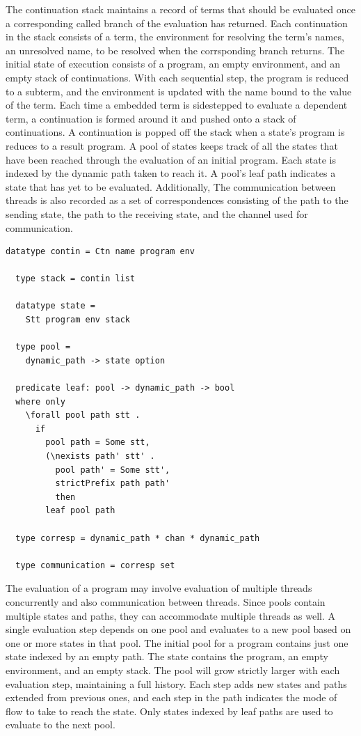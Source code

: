 \documentclass[letterpaper, 11pt]{extarticle}
\begin{document}
The continuation stack maintains a record of terms that should be evaluated
once a corresponding called branch of the evaluation has returned.
Each continuation in the stack consists of a term, the environment for resolving the
term's names, an unresolved name, to be resolved when the corrsponding branch returns. 
The initial state of execution consists of a program, an empty environment, and an empty stack
of continuations. With each sequential step, the program is reduced to a subterm,
and the environment is updated with the name bound to the value of the term. Each time a
embedded term is sidestepped to evaluate a dependent term, a continuation is formed around
it and pushed onto a stack of continuations. A continuation is popped off the stack when a
state's program is reduces to a result program.  A pool of states keeps track of all the states
that have been reached through the evaluation of an initial program.  Each state is indexed by
the dynamic path taken to reach it. A pool's leaf path indicates a state that has yet to be
evaluated. Additionally, The communication between threads is also recorded as a set of
correspondences consisting of the path to the sending state, the path to the receiving state,
and the channel used for communication.

\begin{lstlisting}[language=logic, mathescape]
  datatype contin = Ctn name program env

  type stack = contin list

  datatype state =
    Stt program env stack 

  type pool =
    dynamic_path -> state option

  predicate leaf: pool -> dynamic_path -> bool
  where only
    \forall pool path stt .
      if
        pool path = Some stt,
        (\nexists path' stt' .
          pool path' = Some stt',
          strictPrefix path path'
          then
        leaf pool path

  type corresp = dynamic_path * chan * dynamic_path

  type communication = corresp set 
\end{lstlisting}

The evaluation of a program may involve evaluation of multiple threads concurrently and also
communication between threads. Since pools contain multiple states and paths, they can
accommodate multiple threads as well.  A single evaluation step depends on one pool and
evaluates to a new pool based on one or more states in that pool. The initial pool for a
program contains just one state indexed by an empty path. The state contains the program, an
empty environment, and an empty stack. The pool will grow strictly larger with each evaluation
step, maintaining a full history. Each step adds new states and paths extended from previous
ones, and each step in the path indicates the mode of flow to take to reach the state.
Only states indexed by leaf paths are used to evaluate to the next pool.
\end{document}
